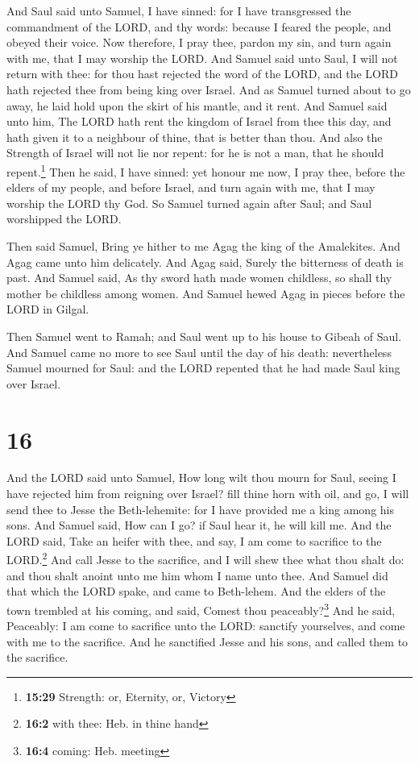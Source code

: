  And Saul said unto Samuel, I have sinned: for I have
transgressed the commandment of the LORD, and thy words: because I
feared the people, and obeyed their voice.  Now
therefore, I pray thee, pardon my sin, and turn again with me, that I
may worship the LORD.  And Samuel said unto Saul, I will
not return with thee: for thou hast rejected the word of the LORD, and
the LORD hath rejected thee from being king over Israel. 
And as Samuel turned about to go away, he laid hold upon the skirt of
his mantle, and it rent.  And Samuel said unto him, The
LORD hath rent the kingdom of Israel from thee this day, and hath given
it to a neighbour of thine, that is better than thou. 
And also the Strength of Israel will not lie nor repent: for he is not a
man, that he should repent.\footnote{\textbf{15:29} Strength: or,
  Eternity, or, Victory}  Then he said, I have sinned:
yet honour me now, I pray thee, before the elders of my people, and
before Israel, and turn again with me, that I may worship the LORD thy
God.  So Samuel turned again after Saul; and Saul
worshipped the LORD.

 Then said Samuel, Bring ye hither to me Agag the king of
the Amalekites. And Agag came unto him delicately. And Agag said, Surely
the bitterness of death is past.  And Samuel said, As thy
sword hath made women childless, so shall thy mother be childless among
women. And Samuel hewed Agag in pieces before the LORD in Gilgal.

 Then Samuel went to Ramah; and Saul went up to his house
to Gibeah of Saul.  And Samuel came no more to see Saul
until the day of his death: nevertheless Samuel mourned for Saul: and
the LORD repented that he had made Saul king over Israel.

\hypertarget{section-15}{%
\section{16}\label{section-15}}

 And the LORD said unto Samuel, How long wilt thou mourn
for Saul, seeing I have rejected him from reigning over Israel? fill
thine horn with oil, and go, I will send thee to Jesse the
Beth-lehemite: for I have provided me a king among his sons.
 And Samuel said, How can I go? if Saul hear it, he will
kill me. And the LORD said, Take an heifer with thee, and say, I am come
to sacrifice to the LORD.\footnote{\textbf{16:2} with thee: Heb. in
  thine hand}  And call Jesse to the sacrifice, and I will
shew thee what thou shalt do: and thou shalt anoint unto me him whom I
name unto thee.  And Samuel did that which the LORD spake,
and came to Beth-lehem. And the elders of the town trembled at his
coming, and said, Comest thou peaceably?\footnote{\textbf{16:4} coming:
  Heb. meeting}  And he said, Peaceably: I am come to
sacrifice unto the LORD: sanctify yourselves, and come with me to the
sacrifice. And he sanctified Jesse and his sons, and called them to the
sacrifice.

